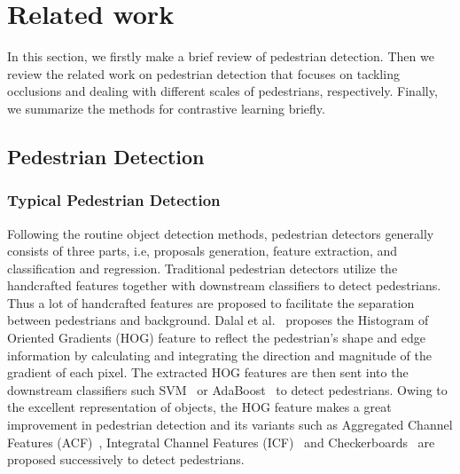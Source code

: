 \documentclass[journal]{IEEEtran}
\begin{document}
\section{Related work}


In this section, we firstly make a brief review of pedestrian detection. Then we review the related work on pedestrian detection that focuses on tackling occlusions and dealing with different scales of pedestrians, respectively. Finally, we summarize the methods for contrastive learning briefly.
\subsection{Pedestrian Detection}
\subsubsection{Typical Pedestrian Detection}
Following the routine object detection methods, pedestrian detectors generally consists of three parts, i.e, proposals generation, feature extraction, and classification and regression. Traditional pedestrian detectors utilize the handcrafted features together with downstream classifiers to detect pedestrians. Thus a lot of handcrafted features are proposed to facilitate the separation between pedestrians and background. Dalal et al.~\cite{dalal2005histograms} proposes the Histogram of Oriented Gradients (HOG) feature to reflect the pedestrian's shape and edge information by calculating and integrating the direction and magnitude of the gradient of each pixel. The extracted HOG features are then sent into the downstream classifiers such SVM~\cite{dalal2005histograms} or AdaBoost~\cite{bourdev2005robust} to detect pedestrians. Owing to the excellent representation of objects, the HOG feature makes a great improvement in pedestrian detection and its variants such as Aggregated Channel Features (ACF)~\cite{dollar2014fast},  Integratal Channel Features (ICF)~\cite{dollar2009integral} and Checkerboards~\cite{zhang2015filtered} are proposed successively to detect pedestrians.
\end{document}
